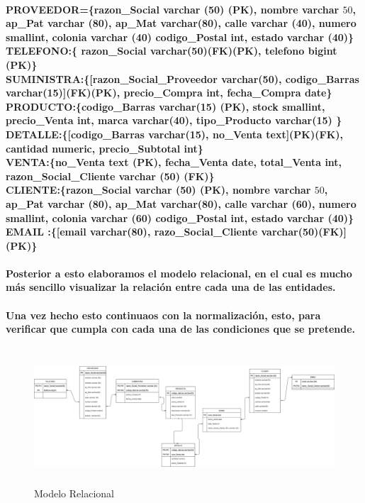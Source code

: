\documentclass{article}
\begin{document}
	 
	 \paragraph{PROVEEDOR=\{razon\_Social varchar (50) (PK), nombre varchar \(50\), ap\_Pat varchar (80), ap\_Mat varchar(80), calle varchar (40), numero smallint, colonia varchar (40) codigo\_Postal int, estado varchar (40)\}\\
	 TELEFONO:\{ razon\_Social varchar(50)(FK)(PK), telefono bigint (PK)\}\\
	 SUMINISTRA:\{[razon\_Social\_Proveedor varchar(50), codigo\_Barras varchar(15)](FK)(PK), precio\_Compra int, fecha\_Compra date\}\\
	 PRODUCTO:\{codigo\_Barras varchar(15) (PK), stock smallint, precio\_Venta int, marca varchar(40), tipo\_Producto varchar(15) \}\\
	 DETALLE:\{[codigo\_Barras varchar(15), no\_Venta text](PK)(FK), cantidad numeric, precio\_Subtotal int\}\\
	 VENTA:\{no\_Venta text (PK), fecha\_Venta date, total\_Venta int, razon\_Social\_Cliente varchar (50) (FK)\}\\
	 CLIENTE:\{razon\_Social varchar (50) (PK), nombre varchar \(50\), ap\_Pat varchar (80), ap\_Mat varchar(80), calle varchar (60), numero smallint, colonia varchar (60) codigo\_Postal int, estado varchar (40)\}\\
	 EMAIL :\{[email varchar(80), razo\_Social\_Cliente varchar(50)(FK)](PK)\}
	 }

    \paragraph{Posterior a esto elaboramos el modelo relacional, en el cual es mucho más sencillo visualizar la relación entre cada una de las entidades.}

	 \paragraph{Una vez hecho esto continuaos con la normalización, esto, para verificar que cumpla con cada una de las condiciones que se pretende.}
	  \begin{figure}[h]
	     \centering
	   \includegraphics[height= 5cm, width=17cm]{MR.png}
	   \caption{Modelo Relacional}
	     \label{Inter}
	 \end{figure}
\end{document}
